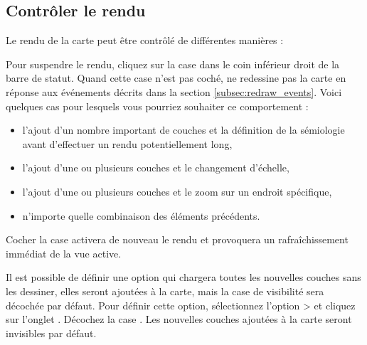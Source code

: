 \subsection{Contrôler le rendu} \label{label_controlmap}

Le rendu de la carte peut être contrôlé de différentes manières :

 
\label{label_suspendrender}

Pour suspendre le rendu, cliquez sur la case dans le coin inférieur droit de la barre de statut. Quand cette case n'est pas coché, \qg ne redessine pas la carte en réponse aux événements décrits dans la section \ref{subsec:redraw_events}. Voici quelques cas pour lesquels vous pourriez souhaiter ce comportement :

\begin{itemize}[label=--]
\item l'ajout d'un nombre important de couches et la définition de la sémiologie avant d'effectuer un rendu potentiellement long,
\item l'ajout d'une ou plusieurs couches et le changement d'échelle,
\item l'ajout d'une ou plusieurs couches et le zoom sur un endroit spécifique,
\item n'importe quelle combinaison des éléments précédents.
\end{itemize}

Cocher la case  activera de nouveau le rendu et provoquera un rafraîchissement immédiat de la vue active.

 \label{label_settinglayer}
 

Il est possible de définir une option qui chargera toutes les nouvelles couches sans les dessiner, elles seront ajoutées à la carte, mais la case de visibilité sera décochée par défaut. Pour définir cette option, sélectionnez l'option  >  et cliquez sur l'onglet . Décochez la case . Les nouvelles couches ajoutées à la carte seront invisibles par défaut.

%
%
%
\label{label_updatemap} 

